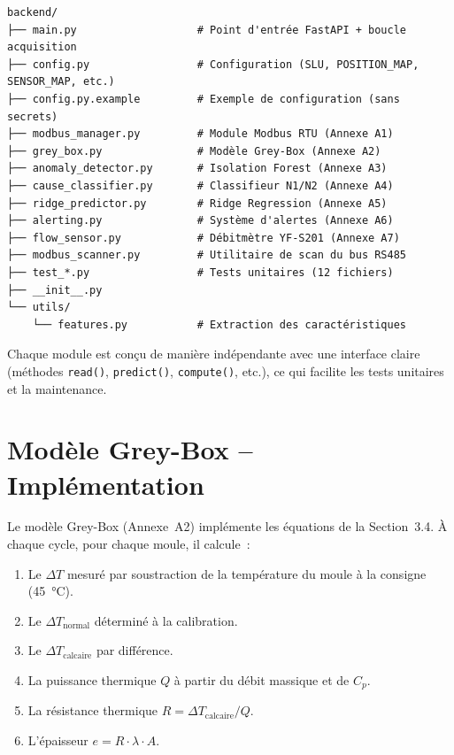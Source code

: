 \begin{center}
\begin{minipage}{0.70\textwidth}
\begin{verbatim}
backend/
├── main.py                   # Point d'entrée FastAPI + boucle acquisition
├── config.py                 # Configuration (SLU, POSITION_MAP, SENSOR_MAP, etc.)
├── config.py.example         # Exemple de configuration (sans secrets)
├── modbus_manager.py         # Module Modbus RTU (Annexe A1)
├── grey_box.py               # Modèle Grey-Box (Annexe A2)
├── anomaly_detector.py       # Isolation Forest (Annexe A3)
├── cause_classifier.py       # Classifieur N1/N2 (Annexe A4)
├── ridge_predictor.py        # Ridge Regression (Annexe A5)
├── alerting.py               # Système d'alertes (Annexe A6)
├── flow_sensor.py            # Débitmètre YF-S201 (Annexe A7)
├── modbus_scanner.py         # Utilitaire de scan du bus RS485
├── test_*.py                 # Tests unitaires (12 fichiers)
├── __init__.py
└── utils/
    └── features.py           # Extraction des caractéristiques
\end{verbatim}
\end{minipage}
\end{center}

Chaque module est conçu de manière indépendante avec une interface claire (méthodes \texttt{read()}, \texttt{predict()}, \texttt{compute()}, etc.), ce qui facilite les tests unitaires et la maintenance.

\section{Modèle Grey-Box -- Implémentation}

Le modèle Grey-Box (Annexe~A2) implémente les équations de la Section~3.4. À chaque cycle, pour chaque moule, il calcule~:

\begin{enumerate}
  \item Le \(\Delta T\) mesuré par soustraction de la température du moule à la consigne (45~\si{\celsius}).
  \item Le \(\Delta T_{\text{normal}}\) déterminé à la calibration.
  \item Le \(\Delta T_{\text{calcaire}}\) par différence.
  \item La puissance thermique \(Q\) à partir du débit massique et de \(C_p\).
  \item La résistance thermique \(R = \Delta T_{\text{calcaire}} / Q\).
  \item L'épaisseur \(e = R \cdot \lambda \cdot A\).
\end{enumerate}

